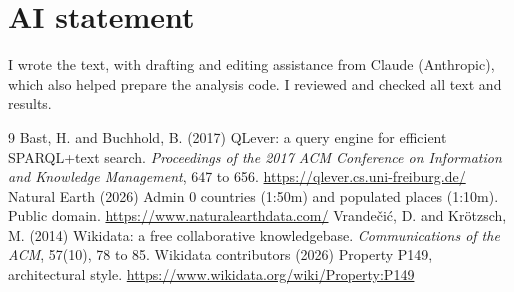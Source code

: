 \documentclass[11pt,a4paper]{article}
\begin{document}
\section*{AI statement}
I wrote the text, with drafting and editing assistance from Claude (Anthropic), which also helped prepare the analysis code. I reviewed and checked all text and results.

\begin{thebibliography}{9}
 Bast, H. and Buchhold, B. (2017) QLever: a query engine for efficient SPARQL+text search. \emph{Proceedings of the 2017 ACM Conference on Information and Knowledge Management}, 647 to 656. \url{https://qlever.cs.uni-freiburg.de/}
 Natural Earth (2026) Admin 0 countries (1:50m) and populated places (1:10m). Public domain. \url{https://www.naturalearthdata.com/}
 Vrandečić, D. and Krötzsch, M. (2014) Wikidata: a free collaborative knowledgebase. \emph{Communications of the ACM}, 57(10), 78 to 85.
 Wikidata contributors (2026) Property P149, architectural style. \url{https://www.wikidata.org/wiki/Property:P149}
\end{thebibliography}
\end{document}
